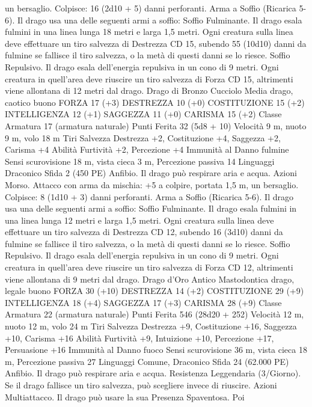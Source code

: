 \begin{multicols}{2}
un bersaglio.
Colpisce: 16 (2d10 + 5) danni perforanti.
Arma a Soffio (Ricarica 5-6). Il drago usa una delle seguenti armi
a soffio:
Soffio Fulminante. Il drago esala fulmini in una linea lunga 18 metri
e larga 1,5 metri. Ogni creatura sulla linea deve effettuare un tiro
salvezza di Destrezza CD 15, subendo 55 (10d10) danni da fulmine
se fallisce il tiro salvezza, o la metà di questi danni se lo riesce.
Soffio Repulsivo. Il drago esala dell’energia repulsiva in un cono di 9
metri. Ogni creatura in quell’area deve riuscire un tiro salvezza di
Forza CD 15, altrimenti viene allontana di 12 metri dal drago.
Drago di Bronzo Cucciolo
Media drago, caotico buono
FORZA 17 (+3)
DESTREZZA 10 (+0)
COSTITUZIONE 15 (+2)
INTELLIGENZA 12 (+1)
SAGGEZZA 11 (+0)
CARISMA 15 (+2)
Classe Armatura 17 (armatura naturale)
Punti Ferita 32 (5d8 + 10)
Velocità 9 m, nuoto 9 m, volo 18 m
Tiri Salvezza Destrezza +2, Costituzione +4, Saggezza +2,
Carisma +4
Abilità Furtività +2, Percezione +4
Immunità al Danno fulmine
Sensi scurovisione 18 m, vista cieca 3 m, Percezione passiva 14
Linguaggi Draconico
Sfida 2 (450 PE)
Anfibio. Il drago può respirare aria e acqua.
Azioni
Morso. Attacco con arma da mischia: +5 a colpire, portata 1,5
m, un bersaglio.
Colpisce: 8 (1d10 + 3) danni perforanti.
Arma a Soffio (Ricarica 5-6). Il drago usa una delle seguenti armi
a soffio:
Soffio Fulminante. Il drago esala fulmini in una linea lunga 12 metri
e larga 1,5 metri. Ogni creatura sulla linea deve effettuare un tiro
salvezza di Destrezza CD 12, subendo 16 (3d10) danni da fulmine se
fallisce il tiro salvezza, o la metà di questi danni se lo riesce.
Soffio Repulsivo. Il drago esala dell’energia repulsiva in un cono di 9
metri. Ogni creatura in quell’area deve riuscire un tiro salvezza di
Forza CD 12, altrimenti viene allontana di 9 metri dal drago.
Drago d’Oro Antico
Mastodontica drago, legale buono
FORZA 30 (+10)
DESTREZZA 14 (+2)
COSTITUZIONE 29 (+9)
INTELLIGENZA 18 (+4)
SAGGEZZA 17 (+3)
CARISMA 28 (+9)
Classe Armatura 22 (armatura naturale)
Punti Ferita 546 (28d20 + 252)
Velocità 12 m, nuoto 12 m, volo 24 m
Tiri Salvezza Destrezza +9, Costituzione +16, Saggezza +10,
Carisma +16
Abilità Furtività +9, Intuizione +10, Percezione +17, Persuasione +16
Immunità al Danno fuoco
Sensi scurovisione 36 m, vista cieca 18 m, Percezione passiva 27
Linguaggi Comune, Draconico
Sfida 24 (62.000 PE)
Anfibio. Il drago può respirare aria e acqua.
Resistenza Leggendaria (3/Giorno). Se il drago fallisce un tiro
salvezza, può scegliere invece di riuscire.
Azioni
Multiattacco. Il drago può usare la sua Presenza Spaventosa. Poi

\end{multicols}
